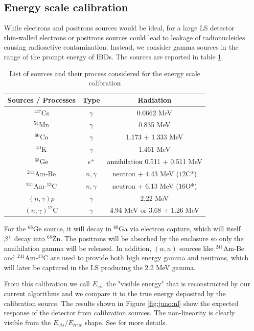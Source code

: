\documentclass[../main.tex]{subfiles}
\begin{document}
\subsection{Energy scale calibration}

While electrons and positrons sources would be ideal, for a large LS detector thin-walled electrons or positrons sources could lead to leakage of radionucleides causing radioactive contamination. Instead, we consider gamma sources in the range of the prompt energy of IBDs. The sources are reported in table \ref{tab:juno:calib_source}.

\begin{table}[ht]
  \centering
  \begin{tabular}{|c|c|c|}
    \hline
    Sources / Processes & Type & Radiation \\
    \hline
    $^{137}$Cs          & $\gamma$ & 0.0662 MeV \\
    $^{54}$Mn           & $\gamma$ & 0.835 MeV \\
    $^{60}$Co           & $\gamma$ & 1.173 + 1.333 MeV \\
    $^{40}$K            & $\gamma$ & 1.461 MeV \\
    $^{68}$Ge           & $e^{+}$  &  annihilation 0.511 + 0.511 MeV \\
    $^{241}$Am-Be       & $n,\gamma$ & neutron + 4.43 MeV (${12}$C*) \\
    $^{241}$Am-$^{13}$C & $n,\gamma$ & neutron + 6.13 MeV (${16}$O*) \\
    $(n, \gamma)p$      & $\gamma$ & 2.22 MeV \\
    $(n, \gamma)^{12}$C & $\gamma$ & 4.94 MeV or 3.68 + 1.26 MeV \\
    \hline
  \end{tabular}
  \caption{List of sources and their process considered for the energy scale calibration}
  \label{tab:juno:calib_source}
\end{table}

For the $^{68}$Ge source, it will decay in $^{68}$Ga via electron capture, which will itself $\beta^+$ decay into $^{68}$Zn. The positrons will be absorbed by the enclosure so only the annihilation gamma will be released. In addition, $(\alpha, n)$ sources like $^{241}$Am-Be and $^{241}$Am-$^{13}$C are used to provide both high energy gamma and neutrons, which will later be captured in the LS producing the 2.2 MeV gamma.

From this calibration we call $E_{vis}$ the "visible energy" that is reconstructed by our current algorithms and we compare it to the true energy deposited by the calibration source. The results shown in Figure \ref{fig:juno:nl} show the expected response of the detector from calibration sources. The non-linearity is clearly visible from the $E_{vis} / E_{true}$ shape. See \cite{juno_collaboration_calibration_2021} for more details.
\end{document}
